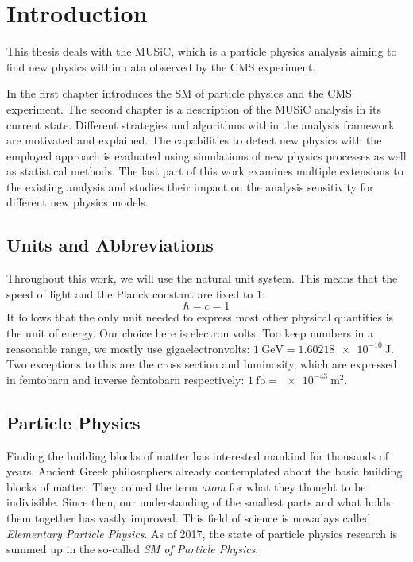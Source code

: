 
\chapter{Introduction}

This thesis deals with the \acf{MUSiC}, which is a particle physics analysis aiming to find new physics within data observed by the \acs{CMS} experiment.

In the first chapter introduces the \acl{SM} of particle physics and the \acs{CMS} experiment. 
The second chapter is a description of the \acs{MUSiC} analysis in its current state. Different strategies and algorithms within the analysis framework are motivated and explained. The capabilities to detect new physics with the employed approach is evaluated using simulations of new physics processes as well as statistical methods.
The last part of this work examines multiple extensions to the existing analysis and studies their impact on the analysis sensitivity for different new physics models.

\section{Units and Abbreviations}
Throughout this work, we will use the natural unit system. This means that the speed of light and the Planck constant are fixed to $1$:
\begin{equation*}
    \hbar = c = 1
\end{equation*}
It follows that the only unit needed to express most other physical quantities is the unit of energy. Our choice here is electron volts. Too keep numbers in a reasonable range, we mostly use gigaelectronvolts: $\SI{1}{\giga\eV} = \SI{1.60218e-10}{\joule}$.
Two exceptions to this are the cross section and luminosity, which are expressed in femtobarn and inverse femtobarn respectively: $\SI{1}{\femto\barn} = \SI{e-43}{\meter\squared}$.

\section{Particle Physics}
Finding the building blocks of matter has interested mankind for thousands of years. Ancient Greek philosophers already contemplated about the basic building blocks of matter\cite{Melsen:atomosatomhistory}. They coined the term \emph{atom} for what they thought to be indivisible. Since then, our understanding of the smallest parts and what holds them together has vastly improved. This field of science is nowadays called \emph{Elementary Particle Physics}. As of 2017, the state of particle physics research is summed up in the so-called \emph{\acl{SM} of Particle Physics}.

